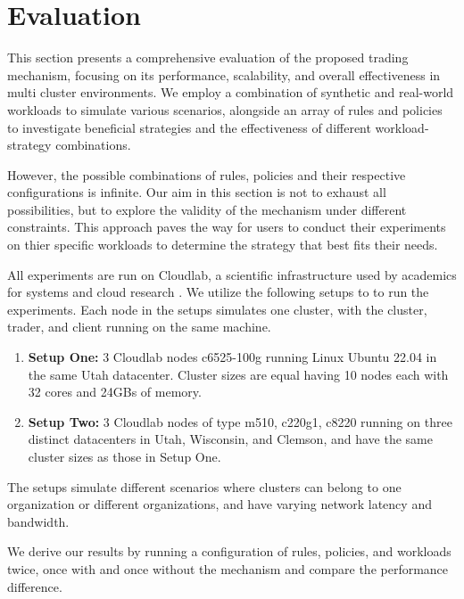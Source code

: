 \chapter{Evaluation}

This section presents a comprehensive evaluation of the proposed trading
mechanism, focusing on its performance, scalability, and overall effectiveness
in multi cluster environments. We employ a combination of synthetic and
real-world workloads to simulate various scenarios, alongside an array of rules
and policies to investigate beneficial strategies and the effectiveness of
different workload-strategy combinations.

However, the possible combinations of rules, policies and their respective
configurations is infinite. Our aim in this section is not to exhaust all
possibilities, but to explore the validity of the mechanism under different
constraints. This approach paves the way for users to conduct their experiments
on thier specific workloads to determine the strategy that best fits their
needs.  

All experiments are run on Cloudlab, a scientific infrastructure used by
academics for systems and cloud research \cite{duplyakin_design_2019}. We
utilize the following setups to to run the experiments. Each node in the setups
simulates one cluster, with the cluster, trader, and client running on the same
machine. 
\begin{enumerate}

  \item \textbf{Setup One:} 3 Cloudlab nodes c6525-100g running Linux
    Ubuntu 22.04 in the same Utah datacenter. Cluster sizes are equal having 10
    nodes each with 32 cores and 24GBs of memory.

  \item \textbf{Setup Two:} 3 Cloudlab nodes of type m510, c220g1, c8220
    running on three distinct datacenters in Utah, Wisconsin, and Clemson, and
    have the same cluster sizes as those in Setup One.

\end{enumerate}

The setups simulate different scenarios where clusters can belong to one
organization or different organizations, and have varying network latency and
bandwidth.  

We derive our results by running a configuration of rules, policies, and
workloads twice, once with and once without the mechanism and compare the
performance difference.

